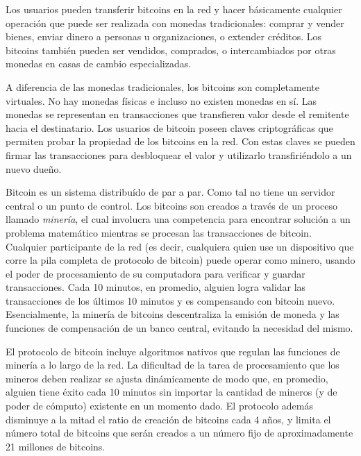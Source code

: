Los usuarios pueden transferir bitcoins en la red y hacer básicamente cualquier operación que puede ser
realizada con monedas tradicionales: comprar y vender bienes, enviar dinero a personas u
organizaciones, o extender créditos. Los bitcoins también pueden ser vendidos, comprados, o intercambiados por
otras monedas en casas de cambio especializadas.

A diferencia de las monedas tradicionales, los bitcoins son completamente virtuales. No hay monedas
físicas e incluso no existen monedas en sí. Las monedas se representan en transacciones que transfieren
valor desde el remitente hacia el destinatario. Los usuarios de bitcoin poseen claves criptográficas
que permiten probar la propiedad de los bitcoins en la red. Con estas claves se pueden firmar las
transacciones para desbloquear el valor y utilizarlo transfiriéndolo a un nuevo dueño. 

Bitcoin es un sistema distribuído de par a par. Como tal no tiene un servidor central o un punto de control.
Los bitcoins son creados a través de un proceso llamado \textit{minería}, el cual involucra una competencia
para encontrar solución a un problema matemático mientras se procesan las transacciones de bitcoin.
Cualquier participante de la red (es decir, cualquiera quien use un dispositivo que corre la pila
completa de protocolo de bitcoin) puede operar como minero, usando el poder de procesamiento de su
computadora para verificar y guardar transacciones. Cada 10 minutos, en promedio, alguien logra validar
las transacciones de los últimos 10 minutos y es compensando con bitcoin nuevo. Esencialmente, la minería
de bitcoins descentraliza la emisión de moneda y las funciones de compensación de un banco central, evitando
la necesidad del mismo.

El protocolo de bitcoin incluye algoritmos nativos que regulan las funciones de minería a lo largo de la
red. La dificultad de la tarea de procesamiento que los mineros deben realizar se ajusta dinámicamente
de modo que, en promedio, alguien tiene éxito cada 10 minutos sin importar la cantidad de mineros (y
de poder de cómputo) existente en un momento dado. El protocolo además disminuye a la mitad el ratio de creación
de bitcoins cada 4 años, y limita el número total de bitcoins que serán creados a un número fijo de
aproximadamente 21 millones de bitcoins.

